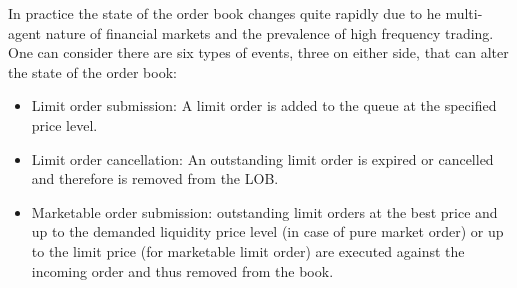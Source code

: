 In practice the state of the order book changes quite rapidly due to he multi-agent nature of financial markets and the prevalence of high frequency trading. One can consider there are six types of events, three on either side, that can alter the state of the order book:
	\begin{itemize}
	\item Limit order submission: A limit order is added to the queue at the specified price level.
	\item Limit order cancellation: An outstanding limit order is expired or cancelled and therefore is removed from the LOB.
	\item Marketable order submission: outstanding limit orders at the best price and up to the demanded liquidity price level (in case of pure market order) or up to the limit price (for marketable limit order) are executed against the incoming order and thus removed from the book.
	\end{itemize}


